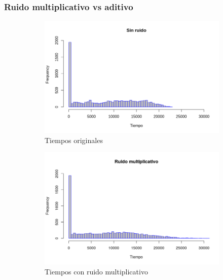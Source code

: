 \documentclass[11pt]{beamer}
\begin{document}
\begin{frame}
    \frametitle{Ruido multiplicativo vs aditivo}
    \begin{figure}[H]
    \centering
    \begin{subfigure}[h]{0.45\textwidth}
        \includegraphics[width=\textwidth]{img/sinRuido.png}
        \caption{Tiempos originales}
        \label{fig:Tiempos originales}
    \end{subfigure}%
    \hfill
    \begin{subfigure}[h]{0.45\textwidth}
            \includegraphics[width=\textwidth]{img/ruidoMultiplicativo.png}
            \caption{Tiempos con ruido multiplicativo}
            \label{fig:Tiempos con ruido multiplicativo}
        \end{subfigure}%
    \hfill
        \begin{subfigure}[h]{0.45\textwidth} 

\end{subfigure}
\end{figure}
\end{frame}
\end{document}
